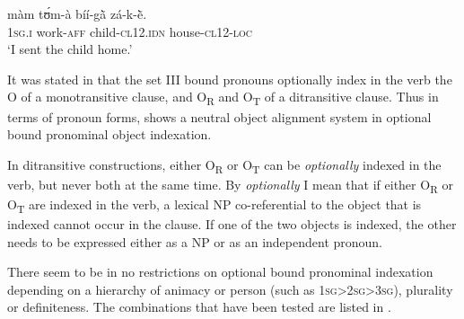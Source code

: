 \documentclass[output=paper]{langsci/langscibook}
\begin{document}
\z

\ea
\label{ex:23.pacchiarotti}
\gll màm    tʊ́m-à    bíí-g\`{ã}      zá-k-\`{ẽ}. \\
\textsc{1sg.i}    work-\textsc{aff}  child-\textsc{cl12.idn}  house-\textsc{cl12-loc}\\
\glt `I sent the child home.'\footnotemark {} 
\z

\z

It was stated in  that the set III bound pronouns optionally index in the verb the O of a monotransitive clause, and O\textsubscript{R} and O\textsubscript{T} of a ditransitive clause. Thus in terms of pronoun forms,  shows a neutral object alignment system in optional bound pronominal object indexation.  

In ditransitive constructions, either O\textsubscript{R} or O\textsubscript{T} can be \textit{optionally} indexed in the verb, but never both at the same time. By \textit{optionally} I mean that if either O\textsubscript{R} or O\textsubscript{T} are indexed in the verb, a lexical NP co-referential to the object that is indexed cannot occur in the clause. If one of the two objects is indexed, the other needs to be expressed either as a NP or as an independent pronoun. 

There seem to be in  no restrictions on optional bound pronominal indexation depending on a hierarchy of animacy or person (such as 1\textsc{sg}>2\textsc{sg}>3\textsc{sg}), plurality or definiteness. The combinations that have been tested are listed in .
\end{document}
